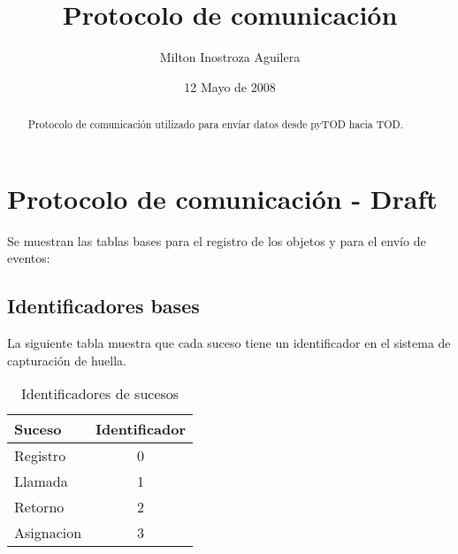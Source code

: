 \documentclass[10pt,a4paper]{article}
\begin{document}
\renewcommand{\contentsname}{Indice} 
\renewcommand\listfigurename{Lista de Figuras}
\renewcommand\listtablename{Lista de Tablas}
\newcommand\bibname{Bibliografía}
\renewcommand{\refname}{Bibliografía}
\renewcommand\indexname{Indice alfabético}
\renewcommand\figurename{Figura}
\renewcommand\tablename{Tabla}
\renewcommand\partname{Parte}
\newcommand\chaptername{Capítulo}
\renewcommand\appendixname{Apéndice}
\renewcommand\abstractname{Resumen}

\title{Protocolo de comunicación}
\author{Milton Inostroza Aguilera}
\date{12 Mayo de 2008}
\clearpage
\maketitle

\begin{abstract}

Protocolo de comunicación utilizado para envíar datos desde pyTOD hacia TOD.

\end{abstract}
\newpage
\listoftables
\newpage

\section{Protocolo de comunicación - Draft}

Se muestran las tablas bases para el registro de los objetos y para el envío de eventos:

\subsection{Identificadores bases}

La siguiente tabla muestra que cada suceso tiene un identificador en el sistema de capturación de huella.
\begin{table}[!h]
\begin{center}
\begin{tabular}{|l | c |}
\hline
Suceso & Identificador\\
\hline
Registro & 0\\
\hline
Llamada & 1\\
\hline
Retorno & 2\\
\hline
Asignacion & 3\\
\hline
\end{tabular}
\caption{Identificadores de sucesos} 
\end{center}
\end{table}
\end{document}
